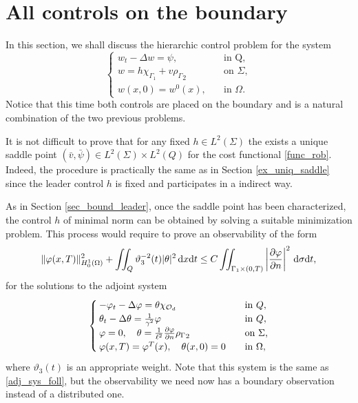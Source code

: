 \documentclass[preprint,10pt]{article}
\numberwithin{equation}{section}
\numberwithin{theorem}{section}
\def\dx{\,\textnormal{d}x}
\def\dt{\textnormal{d}t}
\def\d{\,\textnormal{d}}
\def\cbd{\Gamma}
\def\csbd{\rho_{\Gamma}}
\def\dx{\,\textnormal{d}x}
\def\dt{\textnormal{d}t}
\def\d{\,\textnormal{d}}
\begin{document}
{\section{All controls on the boundary}\label{sec_bound}

In this section, we shall discuss the hierarchic control problem for the system
%
\begin{equation}\label{sys_sec3}
\begin{cases}
w_t-\Delta w=\psi, & \quad \text{in Q}, \\
w=h\chi_{\cbd_1}+ v{\csbd}_2&\quad \text{on } \Sigma, \\
w(x,0)=w^0(x), &\quad \text{in } \Omega.
\end{cases}
\end{equation}
%
Notice that this time both controls are placed on the boundary and is a natural combination of the two previous problems. %

It is not difficult to prove that for any fixed $h\in L^2(\Sigma)$ the exists a unique saddle point $(\bar v,\bar \psi)\in L^2(\Sigma)\times L^2(Q)$ for the cost functional \eqref{func_rob}. Indeed, the procedure is practically the same as in Section \ref{ex_uniq_saddle} since the leader control $h$ is fixed and participates in a indirect way. 

As in Section \ref{sec_bound_leader}, once the saddle point has been characterized, the control $h$ of minimal norm can be obtained by solving a suitable minimization problem. This process would require to prove an observability of the form
%
\begin{equation}\label{obs_ineq_sec3}
\|\varphi(x,T)\|^2_{H_0^1(\Omega)}+\iint_{Q}\vartheta_3^{-2}(t)|\theta|^2\dx\dt\leq C\iint_{ \cbd_1\times(0,T)}\left|\frac{\partial\varphi}{\partial n}\right|^2\d\sigma\dt,
\end{equation}
%
 for the solutions to the adjoint system 
%
\begin{equation}\label{adj_sys_3}
\begin{cases}
-\varphi_t-\Delta \varphi= \theta\chi_{\mathcal O_d} \quad&\textnormal{in }Q, \\
\theta_t-\Delta \theta=\frac{1}{\gamma^2}\varphi \quad& \textnormal{in }Q, \\
\varphi=0, \quad \theta=\frac{1}{\ell^2}\frac{\partial \varphi}{\partial n}{\csbd}_2 \quad &\textnormal{on $\Sigma$,} \\
\varphi(x,T)=\varphi^T(x), \quad \theta(x,0)=0 \quad &\textnormal{in $\Omega$},
\end{cases}
\end{equation}
%
where $\vartheta_3(t)$ is an appropriate weight. Note that this system is the same as \eqref{adj_sys_foll}, but the observability we need now has a boundary observation instead of a distributed one. 

}
\end{document}

